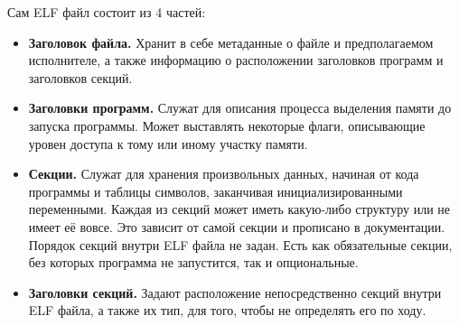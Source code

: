\documentclass[14pt, russian, onesize]{extreport}
\begin{document}
Сам ELF файл состоит из 4 частей:
\begin{itemize}
    \item \textbf{Заголовок файла.}
        Хранит в себе метаданные о файле и предполагаемом исполнителе,
        а также информацию о расположении заголовков программ и заголовков секций.
    \item \textbf{Заголовки программ.}
        Служат для описания процесса выделения памяти до запуска программы. 
        Может выставлять некоторые флаги, описывающие уровен доступа
        к тому или иному участку памяти.
    \item \textbf{Секции.}
        Служат для хранения произвольных данных, начиная от кода программы
        и таблицы символов, заканчивая инициализированными переменными.
        Каждая из секций может иметь какую-либо структуру или не имеет
        её вовсе. Это зависит от самой секции и прописано в документации.
        Порядок секций внутри ELF файла не задан. Есть как обязательные
        секции, без которых программа не запустится, так и опциональные.
    \item \textbf{Заголовки секций.}
        Задают расположение непосредственно секций внутри ELF файла,
        а также их тип, для того, чтобы не определять его по ходу.
\end{itemize}
\end{document}
